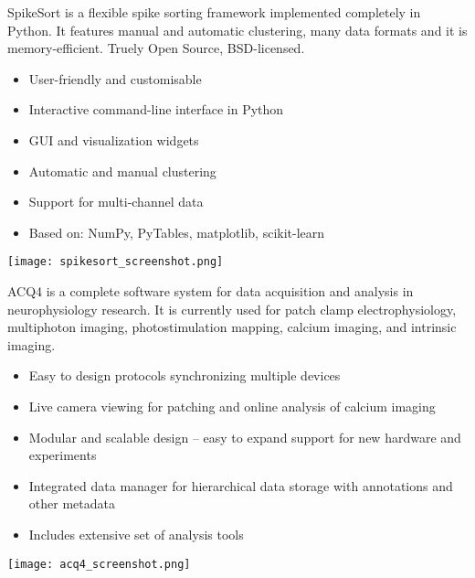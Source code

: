 \begin{multicols}{3}
SpikeSort is a flexible spike sorting framework implemented completely
in Python. It features manual and automatic clustering, many data
formats and it is memory-efficient. Truely Open Source, BSD-licensed.

\begin{itemize}[nolistsep,topsep=0em,leftmargin=1pc]
\item User-friendly and customisable
\item Interactive command-line interface in Python
\item GUI and visualization widgets
\item Automatic and manual clustering
\item Support for multi-channel data
\item Based on: NumPy, PyTables, matplotlib, scikit-learn
\end{itemize}

\vspace{1em}
\texttt{[image: spikesort\_screenshot.png]}


\columnbreak


%



ACQ4 is a complete software system for data acquisition and analysis in neurophysiology research. It is currently used for patch clamp electrophysiology, multiphoton imaging, photostimulation mapping, calcium imaging, and intrinsic imaging.

\begin{itemize}[nolistsep,topsep=0em,leftmargin=1pc]
\item Easy to design protocols synchronizing multiple devices
\item Live camera viewing for patching and online analysis of calcium imaging
\item Modular and scalable design -- easy to expand support for new hardware and experiments
\item Integrated data manager for hierarchical data storage with annotations and other metadata
\item Includes extensive set of analysis tools
\end{itemize}

\vspace{1em}
\texttt{[image: acq4\_screenshot.png]}



\end{multicols}


